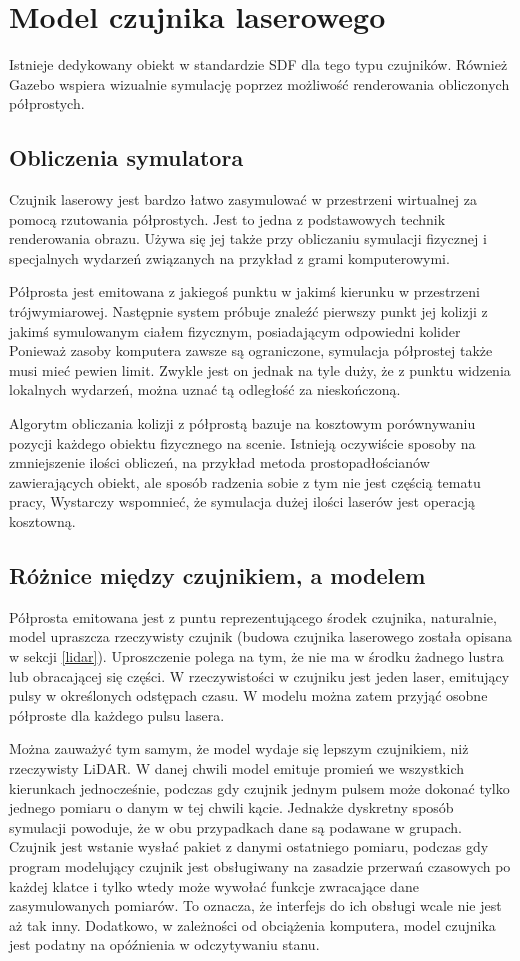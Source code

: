 \chapter{Model czujnika laserowego}
Istnieje dedykowany obiekt w standardzie SDF dla tego typu czujników.
Również Gazebo wspiera wizualnie symulację poprzez możliwość renderowania obliczonych półprostych.

\section{Obliczenia symulatora}
Czujnik laserowy jest bardzo łatwo zasymulować w przestrzeni wirtualnej za pomocą rzutowania półprostych.
Jest to jedna z podstawowych technik renderowania obrazu.
Używa się jej także przy obliczaniu symulacji fizycznej i specjalnych wydarzeń związanych na przykład z grami komputerowymi.

Półprosta jest emitowana z jakiegoś punktu w jakimś kierunku w przestrzeni trójwymiarowej.
Następnie system próbuje znaleźć pierwszy punkt jej kolizji z jakimś symulowanym ciałem fizycznym, posiadającym odpowiedni kolider 
Ponieważ zasoby komputera zawsze są ograniczone, symulacja półprostej także musi mieć pewien limit. 
Zwykle jest on jednak na tyle duży, że z punktu widzenia lokalnych wydarzeń, można uznać tą odległość za nieskończoną.

Algorytm obliczania kolizji z półprostą bazuje na kosztowym porównywaniu pozycji każdego obiektu fizycznego na scenie.
Istnieją oczywiście sposoby na zmniejszenie ilości obliczeń, na przykład metoda prostopadłościanów zawierających obiekt, ale sposób radzenia sobie z tym nie jest
częścią tematu pracy,
Wystarczy wspomnieć, że symulacja dużej ilości laserów jest operacją kosztowną.

\section{Różnice między czujnikiem, a modelem}
Półprosta emitowana jest z puntu reprezentującego środek czujnika, naturalnie, model upraszcza rzeczywisty czujnik (budowa czujnika laserowego została opisana w sekcji \ref{lidar}).
Uproszczenie polega na tym, że nie ma w środku żadnego lustra lub obracającej się części. 
W rzeczywistości w czujniku jest jeden laser, emitujący pulsy w określonych odstępach czasu.
W modelu można zatem przyjąć osobne półproste dla każdego pulsu lasera.

Można zauważyć tym samym, że model wydaje się lepszym czujnikiem, niż rzeczywisty LiDAR.
W danej chwili model emituje promień we wszystkich kierunkach jednocześnie, podczas gdy czujnik jednym pulsem może dokonać tylko jednego pomiaru o danym w tej chwili kącie.
Jednakże dyskretny sposób symulacji powoduje, że w obu przypadkach dane są podawane w grupach.
Czujnik jest wstanie wysłać pakiet z danymi ostatniego pomiaru, podczas gdy program modelujący czujnik jest obsługiwany na zasadzie przerwań czasowych 
po każdej klatce i tylko wtedy może wywołać funkcje zwracające dane zasymulowanych pomiarów.
To oznacza, że interfejs do ich obsługi wcale nie jest aż tak inny.
Dodatkowo, w zależności od obciążenia komputera, model czujnika jest podatny na opóźnienia w odczytywaniu stanu.

